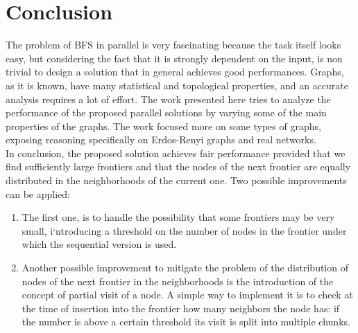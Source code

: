 \section{Conclusion}
The problem of BFS in parallel is very fascinating because the task itself looks easy, but considering the fact that it is strongly dependent on the input, is non trivial to design a solution that in general achieves good performances. Graphs, as it is known, have many statistical and topological properties, and an accurate analysis requires a lot of effort. The work presented here tries to analyze the performance of the proposed parallel solutions by varying some of the main properties of the graphs. The work focused more on some types of graphs, exposing reasoning  specifically on Erdos-Renyi graphs and real networks.
\\
In conclusion, the proposed solution achieves fair performance provided that we find sufficiently large frontiers and that the nodes of the next frontier are equally distributed in the neighborhoods of the current one. Two possible improvements can be applied: 
\begin{enumerate}
    \item The first one, is to handle the possibility that some frontiers may be very small, i`ntroducing a threshold on the number of nodes in the frontier under which the sequential version is used. 
    \item Another possible improvement to mitigate the problem of the distribution of nodes of the next frontier in the neighborhoods is the introduction of the concept of partial visit of a node. A simple way to implement it is to check at the time of insertion into the frontier how many neighbors the node has: if the number is above a certain threshold its visit is split into multiple chunks.
\end{enumerate}